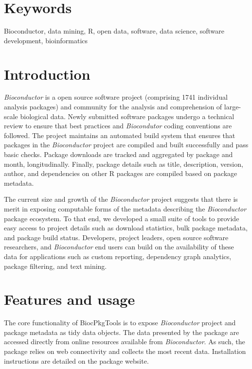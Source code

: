 \documentclass[9pt,a4paper]{extarticle}\usepackage[]{graphicx}\usepackage[]{color}
\begin{document}
\section*{Keywords}

Bioconductor, data mining, R, open data, software, data science, software development, bioinformatics






\clearpage
\pagestyle{main}

\section*{Introduction}

\emph{Bioconductor} is a open source software project (comprising
1741 individual analysis packages) and community for
the analysis and comprehension of large-scale biological data. Newly
submitted software packages undergo a technical review to ensure that
best practices and \emph{Biocondutor} coding conventions are
followed. The project maintains an automated build system that ensures
that packages in the \emph{Bioconductor} project are compiled and
built successfully and pass basic checks. Package downloads are
tracked and aggregated by package and month, longitudinally. Finally,
package details such as title, description, version, author, and
dependencies on other R packages are compiled based on package
metadata.

The current size and growth of the \emph{Bioconductor} project suggests that
there is merit in exposing computable forms of the metadata describing
the \emph{Bioconductor} package ecosystem. To that end, we developed a small
suite of tools to provide easy access to project details such as download
statistics, bulk package metadata, and package build
status. Developers, project leaders, open source software researchers,
and \emph{Bioconductor} end users can build on the availability of these data
for applications such as custom reporting, dependency graph analytics,
package filtering, and text mining.


\section*{Features and usage}

The core functionality of BiocPkgTools is to expose
\emph{Bioconductor} project and package metadata as tidy data
\citep{Wickham2014-ye} objects. The data presented by the package are
accessed directly from online resources available from
\emph{Bioconductor}. As such, the package relies on web connectivity and
collects the most recent data. Installation instructions are detailed
on the package website.
\end{document}
